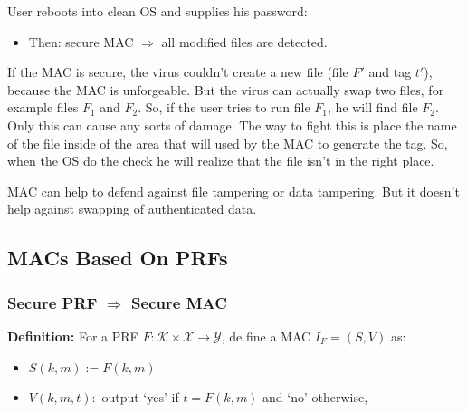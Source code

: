 \documentclass[12pt]{book}
\newcommand{\Def}{\textcolor{dkgreen}{\textbf{Definition:}} }
\begin{document}
User reboots into clean OS and supplies his password:
\begin{itemize}
	\item Then: secure MAC $\Rightarrow$ all modified files are detected.
\end{itemize}If the MAC is secure, the virus couldn't create a new file (file $F'$ and tag $t'$), because the MAC is unforgeable. But the virus can actually swap two files, for example files $F_{1}$ and $F_{2}$. So, if the user tries to run file $F_{1}$, he will find file $F_{2}$. Only this can cause any sorts of damage. The way to fight this is place the name of the file inside of the area that will used by the MAC to generate the tag. So, when the OS do the check he will realize that the file isn't in the right place.

MAC can help to defend against file tampering or data tampering. But it doesn't help against swapping of authenticated data.

\subsection{MACs Based On PRFs}
\subsubsection{Secure PRF $\Rightarrow$ Secure MAC}
\Def For a PRF $F:\mathcal{K}\times\mathcal{X}\rightarrow\mathcal{Y}$, de fine a MAC $I_{F}=(S,V)$ as:
\begin{itemize}
	\item $S(k,m):=F(k,m)$
	\item $V(k,m,t):$ output `yes' if $t=F(k,m)$ and `no' otherwise,
\end{itemize}

\begin{center}
\end{center}
\end{document}
